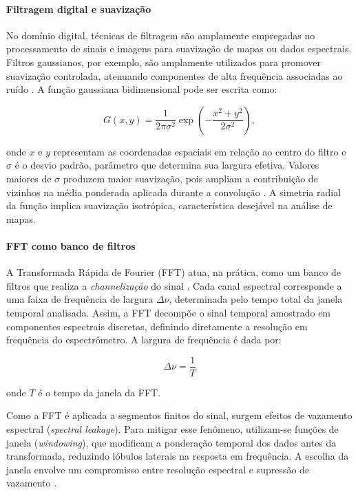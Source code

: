 \paragraph{Filtragem digital e suavização}

No domínio digital, técnicas de filtragem são amplamente empregadas no processamento de sinais e imagens para suavização de mapas ou dados espectrais. Filtros gaussianos, por exemplo, são amplamente utilizados para promover suavização controlada, atenuando componentes de alta frequência associadas ao ruído \cite{Souza2024}.
A função gaussiana bidimensional pode ser escrita como:

\begin{equation}
    G(x,y) = \frac{1}{2\pi\sigma^{2}} \exp\left(-\frac{x^{2}+y^{2}}{2\sigma^{2}}\right),
\end{equation}

onde $x$ e $y$ representam as coordenadas espaciais em relação ao centro do filtro e $\sigma$ é o desvio padrão, parâmetro que determina sua largura efetiva. Valores maiores de $\sigma$ produzem maior suavização, pois ampliam a contribuição de vizinhos na média ponderada aplicada durante a convolução \cite{Souza2024}. A simetria radial da função implica suavização isotrópica, característica desejável na análise de mapas.

\paragraph{FFT como banco de filtros}

A Transformada Rápida de Fourier (FFT) atua, na prática, como um banco de filtros que realiza a \textit{channelização} do sinal \cite{Holzmann2019telecomunicacao}. Cada canal espectral corresponde a uma faixa de frequência de largura $\Delta \nu$, determinada pelo tempo total da janela temporal analisada. Assim, a FFT decompõe o sinal temporal amostrado em componentes espectrais discretas, definindo diretamente a resolução em frequência do espectrômetro. A largura de frequência é dada por: 

\begin{equation}
\Delta \nu = \frac{1}{T}
\end{equation}

onde \(T\) é o tempo da janela da FFT.

Como a FFT é aplicada a segmentos finitos do sinal, surgem efeitos de vazamento espectral (\textit{spectral leakage}). Para mitigar esse fenômeno, utilizam-se funções de janela (\textit{windowing}), que modificam a ponderação temporal dos dados antes da transformada, reduzindo lóbulos laterais na resposta em frequência. A escolha da janela envolve um compromisso entre resolução espectral e supressão de vazamento \cite{MarcelobjApostilaPDS}.

